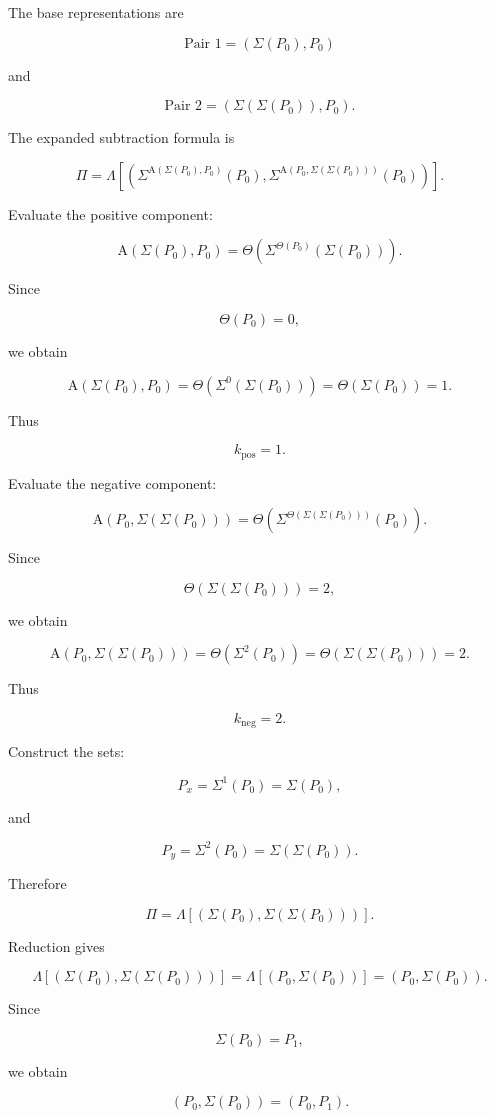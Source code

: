 \documentclass[12pt]{article}
\newcommand{\Alpha}{\mathrm{A}}
\begin{document}
The base representations are

\[
\text{Pair 1}
=
(\Sigma(P_0),P_0)
\]

and

\[
\text{Pair 2}
=
(\Sigma(\Sigma(P_0)),P_0).
\]

The expanded subtraction formula is

\[
\Pi
=
\Lambda\left[
\left(
\Sigma^{\Alpha(\Sigma(P_0),P_0)}(P_0),
\Sigma^{\Alpha(P_0,\Sigma(\Sigma(P_0)))}(P_0)
\right)
\right].
\]

Evaluate the positive component:

\[
\Alpha(\Sigma(P_0),P_0)
=
\Theta\left(
\Sigma^{\Theta(P_0)}(\Sigma(P_0))
\right).
\]

Since

\[
\Theta(P_0)=0,
\]

we obtain

\[
\Alpha(\Sigma(P_0),P_0)
=
\Theta(\Sigma^0(\Sigma(P_0)))
=
\Theta(\Sigma(P_0))
=
1.
\]

Thus

\[
k_{\mathrm{pos}}=1.
\]

Evaluate the negative component:

\[
\Alpha(P_0,\Sigma(\Sigma(P_0)))
=
\Theta\left(
\Sigma^{\Theta(\Sigma(\Sigma(P_0)))}(P_0)
\right).
\]

Since

\[
\Theta(\Sigma(\Sigma(P_0)))=2,
\]

we obtain

\[
\Alpha(P_0,\Sigma(\Sigma(P_0)))
=
\Theta(\Sigma^2(P_0))
=
\Theta(\Sigma(\Sigma(P_0)))
=
2.
\]

Thus

\[
k_{\mathrm{neg}}=2.
\]

Construct the sets:

\[
P_x
=
\Sigma^1(P_0)
=
\Sigma(P_0),
\]

and

\[
P_y
=
\Sigma^2(P_0)
=
\Sigma(\Sigma(P_0)).
\]

Therefore

\[
\Pi
=
\Lambda[(\Sigma(P_0),\Sigma(\Sigma(P_0)))].
\]

Reduction gives

\[
\Lambda[(\Sigma(P_0),\Sigma(\Sigma(P_0)))]
=
\Lambda[(P_0,\Sigma(P_0))]
=
(P_0,\Sigma(P_0)).
\]

Since

\[
\Sigma(P_0)=P_1,
\]

we obtain

\[
(P_0,\Sigma(P_0))
=
(P_0,P_1).
\]
\end{document}
